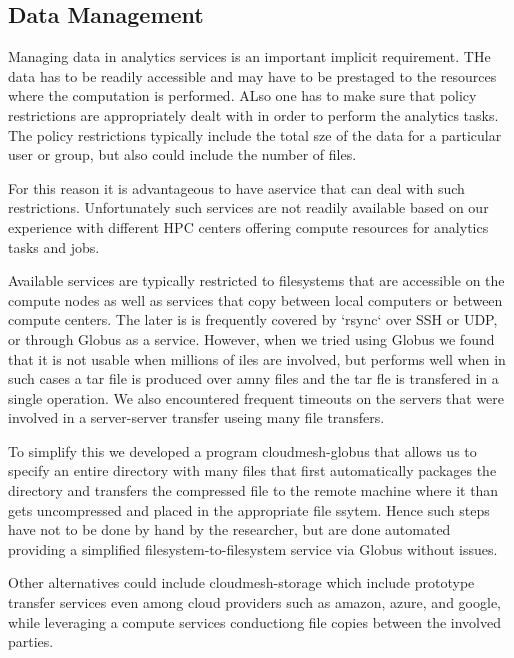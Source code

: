 \subsection{Data Management}
\label{sec:data}

Managing data in analytics services is an important implicit
requirement. THe data has to be readily accessible and may have to be
prestaged to the resources where the computation is performed. ALso
one has to make sure that policy restrictions are appropriately dealt
with in order to perform the analytics tasks. The policy restrictions
typically include the total sze of the data for a particular user or
group, but also could include the number of files.

For this reason it is advantageous to have aservice that can deal with
such restrictions. Unfortunately such services are not readily
available based on our experience with different HPC centers offering
compute resources for analytics tasks and jobs.

Available services are typically restricted to filesystems that are
accessible on the compute nodes as well as services that copy between
local computers or between compute centers. The later is is frequently
covered by `rsync` over SSH or UDP, or through
Globus \cite{www-globus-transfer} as a service. However, when we tried
using Globus we found that it is not usable when millions of iles are
involved, but performs well when in such cases a tar file is produced
over amny files and the tar fle is transfered in a single
operation. We also encountered frequent timeouts on the servers that
were involved in a server-server transfer useing many file transfers.

To simplify this we developed a program
cloudmesh-globus \cite{cloudmesh-globus} that allows us to specify an
entire directory with many files that first automatically packages the
directory and transfers the compressed file to the remote machine
where it than gets uncompressed and placed in the appropriate file
ssytem. Hence such steps have not to be done by hand by the
researcher, but are done automated providing a simplified
filesystem-to-filesystem service via Globus without issues.

Other alternatives could include
cloudmesh-storage \cite{cloudmesh-storage} which include prototype
transfer services even among cloud providers such as amazon, azure,
and google, while leveraging a compute services conductiong file
copies between the involved parties.


